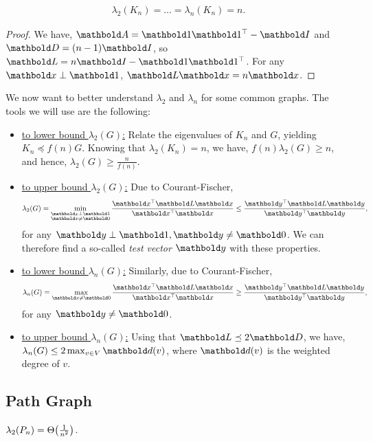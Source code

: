 \begin{lem} \begin{align}
    \lambda_2(K_n) = \dots = \lambda_n(K_n) = n.
\end{align}
\end{lem}
\begin{proof} We have, $\mA = \vOne\trans{\vOne} - \mI$ and $\mD = (n-1)\mI$, so $\mL = n\mI - \vOne\trans{\vOne}$. For any $\vx \perp \vOne$, $\mL\vx = n\vx$.
\end{proof}

We now want to better understand $\lambda_2$ and $\lambda_n$ for some common graphs. The tools we will use are the following: \begin{itemize}
    \item \underline{to lower bound $\lambda_2(G)$:} Relate the eigenvalues of $K_n$ and $G$, yielding $K_n \preceq f(n) G$. Knowing that $\lambda_2(K_n) = n$, we have, $f(n) \lambda_2(G) \geq n$, and hence, $\lambda_2(G) \geq \frac{n}{f(n)}$.
    \item \underline{to upper bound $\lambda_2(G)$:} Due to Courant-Fischer, \begin{align*}
        \lambda_2(G) = \min_{\substack{\vx \perp \vOne \\ \vx \neq \vZero}} \frac{\trans{\vx}\mL\vx}{\trans{\vx}\vx} \leq \frac{\trans{\vy}\mL\vy}{\trans{\vy}\vy},
    \end{align*} for any $\vy \perp \vOne, \vy \neq \vZero$. We can therefore find a so-called \emph{test vector} $\vy$ with these properties.
    \item \underline{to lower bound $\lambda_n(G)$:} Similarly, due to Courant-Fischer, \begin{align*}
        \lambda_n(G) = \max_{\vx \neq \vZero} \frac{\trans{\vx}\mL\vx}{\trans{\vx}\vx} \geq \frac{\trans{\vy}\mL\vy}{\trans{\vy}\vy},
    \end{align*} for any $\vy \neq \vZero$.
    \item \underline{to upper bound $\lambda_n(G)$:} Using that $\mL \preceq 2 \mD$, we have, $\lambda_n(G) \leq 2 \max_{v \in \sV} \vd(v)$, where $\vd(v)$ is the weighted degree of $v$.
\end{itemize}

\subsection{Path Graph}

\begin{exc}\label{exc:spectrum_path_graph_2}
$\lambda_2(P_n) = \Theta\parentheses*{\frac{1}{n^2}}$.
\end{exc}

